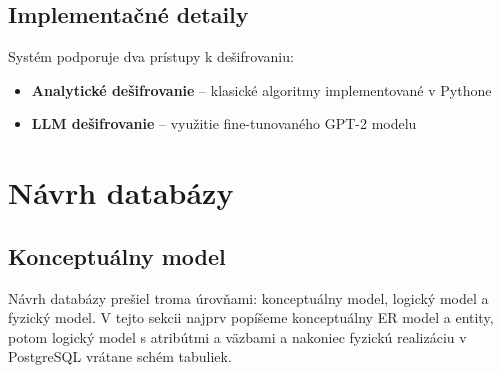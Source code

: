 \documentclass[12pt,a4paper]{article}
\begin{document}
\subsection{Implementačné detaily}
Systém podporuje dva prístupy k dešifrovaniu:
\begin{itemize}
    \item \textbf{Analytické dešifrovanie} -- klasické algoritmy implementované v Pythone
    \item \textbf{LLM dešifrovanie} -- využitie fine-tunovaného GPT-2 modelu
\end{itemize}

\section{Návrh databázy}
\subsection{Konceptuálny model}
Návrh databázy prešiel troma úrovňami: konceptuálny model, logický model a fyzický model. V tejto sekcii najprv popíšeme konceptuálny ER model a entity, potom logický model s atribútmi a väzbami a nakoniec fyzickú realizáciu v PostgreSQL vrátane schém tabuliek.
\end{document}
